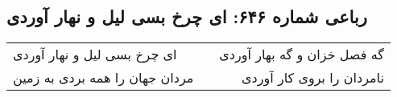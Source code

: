 \begin{center}
\section*{رباعی شماره ۶۴۶: ای چرخ بسی لیل و نهار آوردی}
\label{sec:sh646}
\begin{longtable}{l p{0.5cm} r}
ای چرخ بسی لیل و نهار آوردی
&&
گه فصل خزان و گه بهار آوردی
\\
مردان جهان را همه بردی به زمین
&&
نامردان را بروی کار آوردی
\\
\end{longtable}
\end{center}
